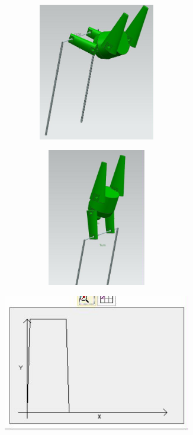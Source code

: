 \documentclass[12pt]{article}
\begin{document}
{\begin{figure}[H]
		\begin{subfigure}{0.32\textwidth}
			\centering\includegraphics[height=6cm,width=1\textwidth,keepaspectratio]{var9_3.jpeg}
			\caption{}
			\label{fig:var9_3.jpeg}
		\end{subfigure}
		\begin{subfigure}{0.32\textwidth}
			\centering\includegraphics[height=6cm,width=1\textwidth,keepaspectratio]{var9_4.jpeg}
			\caption{}
			\label{fig:var9_4.jpeg}
		\end{subfigure}
		\begin{subfigure}{0.32\textwidth}
			\centering\includegraphics[height=6cm,width=1\textwidth,keepaspectratio]{var9_5.jpeg}
			\caption{}
			\label{fig:var9_5.jpeg}
		\end{subfigure}
	\end{figure}
}
\end{document}

